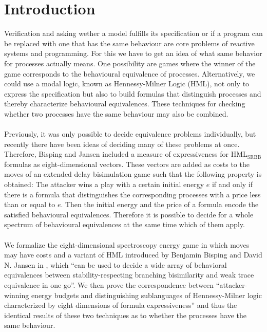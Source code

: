 \newpage
\section{Introduction} %
Verification and asking wether a model fulfills its specification or if a program can be replaced with one that has the same behaviour are core problems of reactive systems and programming.
For this we have to get an idea of what same behavior for processes actually means.
One possibility are games where the winner of the game corresponds to the behavioural equivalence of processes.
Alternatively, we could use a modal logic, known as Hennessy-Milner Logic (HML), not only to express the specification but also to build formulas that distinguish processes and 
thereby characterize behavioural equivalences.
These techniques for checking whether two processes have the same behaviour may also be combined.
\\\\
Previously, it was only possible to decide equivalence problems individually, but recently there have been ideas of deciding many of these problems at once.
Therefore, Bisping and Jansen \cite{bisping2023lineartimebranchingtime} included a measure of expressiveness for HML$_\text{{SRBB}}$ formulas as eight-dimensional vectors.
These vectors are added as costs to the moves of an extended delay bisimulation game such that the following property is obtained: 
The attacker wins a play with a certain initial energy $e$ if and only if there is a formula that distinguishes the corresponding processes with a price less than or equal to $e$.
Then the initial energy and the price of a formula encode the satisfied behavioural equivalences.
Therefore it is possible to decide for a whole spectrum of behavioural equivalences at the same time which of them apply.
\\\\
We formalize the eight-dimensional spectroscopy energy game in which moves may have costs and a variant of HML introduced by Benjamin Bisping and David N. Jansen in \cite{bisping2023lineartimebranchingtime}, 
which ``can be used to decide a wide array of behavioral equivalences between stability-respecting branching bisimilarity and weak trace equivalence in one go''\cite{bisping2023lineartimebranchingtime}.
We then prove the correspondence between ``attacker-winning energy budgets and distinguishing sublanguages of Hennessy-Milner logic characterized by eight dimensions of formula expressiveness'' 
and thus the identical results of these two techniques as to whether the processes have the same behaviour.
